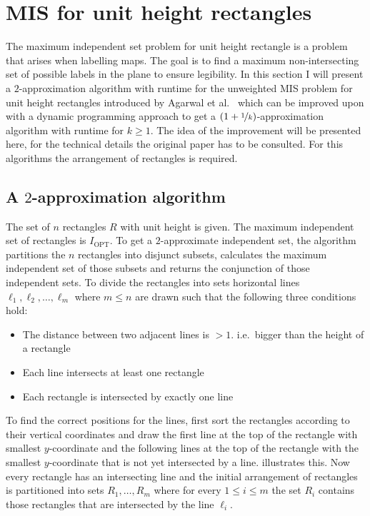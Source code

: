 \section{MIS for unit height rectangles}
The maximum independent set problem for unit height rectangle is a problem that arises when labelling maps. The goal is to find a maximum non-intersecting set of possible labels in the plane to ensure legibility. In this section I will present a $2$-approximation algorithm  with  runtime for the unweighted MIS problem for unit height rectangles introduced by Agarwal et al.~\cite{agarwallabel} which can be improved upon with a dynamic programming approach to get a $(1+\nicefrac{1}{k})$-approximation algorithm with runtime  for $k\geq 1$. The idea of the improvement will be presented here, for the technical details the original paper has to be consulted. For this algorithms the arrangement of rectangles is required.
\subsection{A $2$-approximation algorithm}
The set of $n$ rectangles $R$ with unit height is given. The maximum independent set of rectangles is $I_\text{OPT}$. To get a $2$-approximate independent set, the algorithm partitions the $n$ rectangles into disjunct subsets, calculates the maximum independent set of those subsets and returns the conjunction of those independent sets. To divide the rectangles into sets horizontal lines $\ell_1, \ell_2,\ldots,\ell_m$ where $m\leq n$ are drawn such that the following three conditions hold:
\begin{itemize}
\item The distance between two adjacent lines is $>1$. i.e.\ bigger than the height of a rectangle
\item Each line intersects at least one rectangle
\item Each rectangle is intersected by exactly one line
\end{itemize}
To find the correct positions for the lines, first sort the rectangles according to their vertical coordinates and draw the first line at the top of the rectangle with smallest $y$-coordinate and the following lines at the top of the rectangle with the smallest $y$-coordinate that is not yet intersected by a line.   illustrates this. Now every rectangle has an intersecting line and the initial arrangement of rectangles is partitioned into sets $R_1,\ldots,R_m$ where for every $1\leq i \leq m$ the set $R_i$ contains those rectangles that are intersected by the line $\ell_i$.

